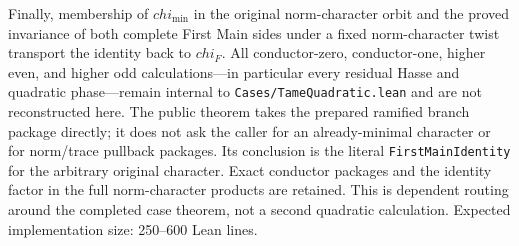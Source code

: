 \begin{theorem}
Finally, membership of \(chi_{\min}\) in the original norm-character orbit
and the proved invariance of both complete First Main sides under a fixed
norm-character twist transport the identity back to \(chi_F\).  All
conductor-zero, conductor-one, higher even, and higher odd calculations---in
particular every residual Hasse and quadratic phase---remain internal to
\texttt{Cases/TameQuadratic.lean} and are not reconstructed here.
\leanok
{}
\FormalizationContract
The public theorem takes the prepared ramified branch package directly; it
does not ask the caller for an already-minimal character or for norm/trace
pullback packages.  Its conclusion is the literal \texttt{FirstMainIdentity}
for the arbitrary original character.  Exact conductor packages and the
identity factor in the full norm-character products are retained.  This is
dependent routing around the completed case theorem, not a second quadratic
calculation.  Expected implementation size: 250--600 Lean lines.
\end{theorem}
